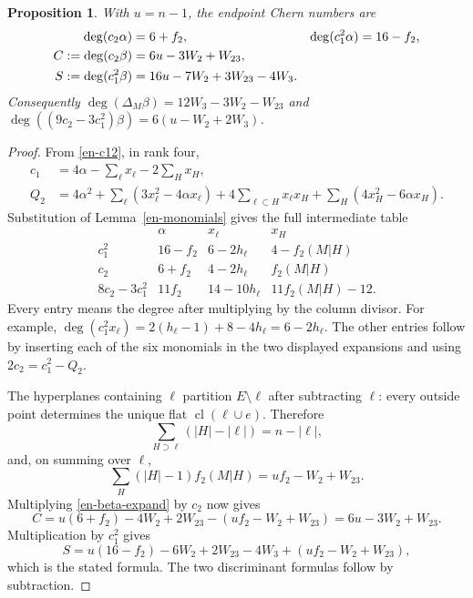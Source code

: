 \documentclass[12pt]{amsart}
\newtheorem{prop}[thm]{Proposition}
\theoremstyle{definition}
\theoremstyle{remark}
\numberwithin{equation}{section}
\begin{document}
\begin{prop}\label{en-moments}
With $u=n-1$, the endpoint Chern numbers are
\begin{align}\label{en-endpoints}
 \deg(c_2\alpha)&=6+f_2,& \deg(c_1^2\alpha)&=16-f_2,\notag\\
 C:=\deg(c_2\beta)&=6u-3W_2+W_{23},\\
 S:=\deg(c_1^2\beta)&=16u-7W_2+3W_{23}-4W_3.\notag
\end{align}
Consequently $\deg(\Delta_M\beta)=12W_3-3W_2-W_{23}$ and
$\deg((9c_2-3c_1^2)\beta)=6(u-W_2+2W_3)$.
\end{prop}
\begin{proof}
From \eqref{en-c12}, in rank four,
\begin{align*}
 c_1&=4\alpha-\sum_\ell x_\ell-2\sum_Hx_H,\\
 Q_2&=4\alpha^2+\sum_\ell(3x_\ell^2-4\alpha x_\ell)
       +4\sum_{\ell\subset H}x_\ell x_H
       +\sum_H(4x_H^2-6\alpha x_H).
\end{align*}
Substitution of Lemma~\ref{en-monomials} gives the full intermediate table
\[
\begin{array}{c|ccc}
 &\alpha&x_\ell&x_H\\\hline
 c_1^2&16-f_2&6-2h_\ell&4-f_2(M|H)\\
 c_2&6+f_2&4-2h_\ell&f_2(M|H)\\
 8c_2-3c_1^2&11f_2&14-10h_\ell&11f_2(M|H)-12.
\end{array}
\]
Every entry means the degree after multiplying by the column divisor.
For example,
$\deg(c_1^2x_\ell)=2(h_\ell-1)+8-4h_\ell=6-2h_\ell$.
The other entries follow by inserting each of the six monomials in the two displayed expansions and using $2c_2=c_1^2-Q_2$.

The hyperplanes containing $\ell$ partition $E\setminus\ell$ after subtracting $\ell$: every outside point determines the unique flat $\operatorname{cl}(\ell\cup e)$. Therefore
\begin{equation}\label{en-partition}
 \sum_{H\supset\ell}(|H|-|\ell|)=n-|\ell|,
\end{equation}
and, on summing over $\ell$,
\[
 \sum_H(|H|-1)f_2(M|H)=u f_2-W_2+W_{23}.
\]
Multiplying \eqref{en-beta-expand} by $c_2$ now gives
\[
 C=u(6+f_2)-4W_2+2W_{23}-(uf_2-W_2+W_{23})
   =6u-3W_2+W_{23}.
\]
Multiplication by $c_1^2$ gives
\[
 S=u(16-f_2)-6W_2+2W_{23}-4W_3+(uf_2-W_2+W_{23}),
\]
which is the stated formula. The two discriminant formulas follow by subtraction.
\end{proof}
\end{document}

